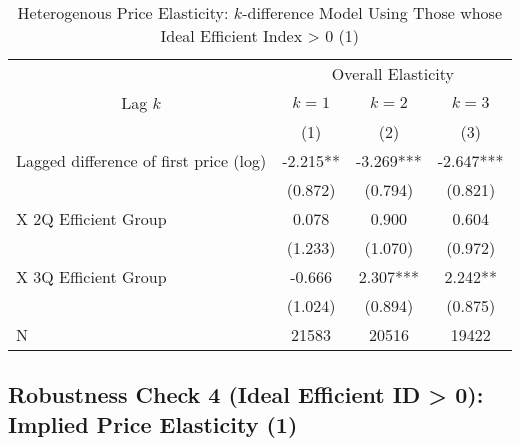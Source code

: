 \documentclass[ review  , 3p ]{elsarticle}
\begin{document}
  \begin{table}

  \caption{\label{tab:kableSubsetHeterokDiffElasticitySlide1}Heterogenous Price Elasticity: $k$-difference Model Using Those whose Ideal Efficient Index > 0 (1)}
  \centering
  \fontsize{8}{10}\selectfont
  \begin{tabular}[t]{lccc}
  \toprule
  \multicolumn{1}{c}{ } & \multicolumn{3}{c}{Overall Elasticity} \\
  \cmidrule(l{3pt}r{3pt}){2-4}
  \multicolumn{1}{c}{Lag $k$} & \multicolumn{1}{c}{$k = 1$} & \multicolumn{1}{c}{$k = 2$} & \multicolumn{1}{c}{$k = 3$} \\
  \cmidrule(l{3pt}r{3pt}){1-1} \cmidrule(l{3pt}r{3pt}){2-2} \cmidrule(l{3pt}r{3pt}){3-3} \cmidrule(l{3pt}r{3pt}){4-4}
   & (1) & (2) & (3)\\
  \midrule
  Lagged difference of first price (log) & -2.215** & -3.269*** & -2.647***\\
   & (0.872) & (0.794) & (0.821)\\
  \hspace{1em}X 2Q Efficient Group & 0.078 & 0.900 & 0.604\\
   & (1.233) & (1.070) & (0.972)\\
  \hspace{1em}X 3Q Efficient Group & -0.666 & 2.307*** & 2.242**\\
   & (1.024) & (0.894) & (0.875)\\
  N & 21583 & 20516 & 19422\\
  \bottomrule
  \end{tabular}
  \end{table}

  \hypertarget{robustness-check-4-ideal-efficient-id-0-implied-price-elasticity-1}{%
  \subsection{Robustness Check 4 (Ideal Efficient ID \textgreater{} 0): Implied Price Elasticity (1)}\label{robustness-check-4-ideal-efficient-id-0-implied-price-elasticity-1}}
\end{document}
